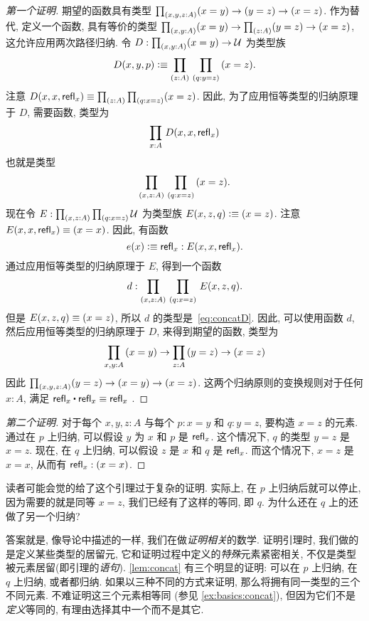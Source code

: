 \begin{proof}[第一个证明]
    期望的函数具有类型 $\prd{x,y,z:A} (x= y) \to (y= z)\to (x= z)$.
    作为替代, 定义一个函数, 具有等价的类型 $\prd{x,y:A} (x= y) \to \prd{z:A} (y= z)\to (x= z)$, 这允许应用两次路径归纳.
    令 $D:\prd{x,y:A} (x=y) \to \type$ 为类型族
    \begin{equation*}
        D(x,y,p)\defeq \prd{z:A}{q:y=z} (x=z).
    \end{equation*}
    注意 $D(x,x,\refl x) \jdeq \prd{z:A}{q:x=z} (x=z)$.
    因此, 为了应用恒等类型的归纳原理于 $D$, 需要函数, 类型为
    \begin{equation}
        \label{eq:concatD}
        \prd{x:A} D(x,x,\refl{x})
    \end{equation}
    也就是类型
    \[ \prd{x,z:A}{q:x=z} (x=z). \]
    现在令 $E:\prd{x,z:A}{q:x=z}\type$ 为类型族 $E(x,z,q)\vcentcolon\equiv (x=z)$.
    注意 $E(x,x,\mathsf{refl}_{x}) \equiv (x=x)$.
    因此, 有函数
    \begin{equation*}
        e(x) \vcentcolon\equiv \mathsf{refl}_{x} : E(x,x,\mathsf{refl}_{x}).
    \end{equation*}
    通过应用恒等类型的归纳原理于 $E$, 得到一个函数
    \begin{equation*}
        d : \prd{x,z:A}{q:x=z} E(x,z,q).
    \end{equation*}
    但是 $E(x,z,q)\equiv (x=z)$, 所以 $d$ 的类型是~\eqref{eq:concatD}.
    因此, 可以使用函数 $d$, 然后应用恒等类型的归纳原理于 $D$, 来得到期望的函数, 类型为
    \begin{equation*}
        \prd{x,y:A} (x= y) \to \prd{z:A} (y= z)\to (x= z)
    \end{equation*}
    因此 $\prd{x,y,z:A} (y=z) \to (x=y) \to (x=z)$.
    这两个归纳原则的变换规则对于任何 $x:A$, 满足 $\refl{x}\ct \refl{x}\jdeq \refl{x}$ .
\end{proof}

\begin{proof}[第二个证明]
    对于每个 $x,y,z:A$ 与每个 $p:x=y$ 和 $q:y=z$, 要构造 $x=z$ 的元素.
    通过在 $p$ 上归纳, 可以假设 $y$ 为 $x$ 和 $p$ 是 $\mathsf{refl}_{x}$.
    这个情况下, $q$ 的类型 $y=z$ 是 $x=z$.
    现在, 在 $q$ 上归纳, 可以假设 $z$ 是 $x$ 和 $q$ 是 $\mathsf{refl}_{x}$.
    而这个情况下, $x=z$ 是 $x=x$, 从而有 $\mathsf{refl}_{x}:(x=x)$.
\end{proof}

读者可能会觉的给了这个引理过于复杂的证明. 实际上, 在 $p$ 上归纳后就可以停止, 因为需要的就是同等 $x=z$, 我们已经有了这样的等同, 即 $q$.
为什么还在 $q$ 上的还做了另一个归纳?

答案就是, 像导论中描述的一样, 我们在做\emph{证明相关}的数学.
%
证明引理时, 我们做的是定义某些类型的居留元, 它和证明过程中定义的\emph{特殊}元素紧密相关, 不仅是类型被元素居留(即引理的\emph{语句}).
\cref{lem:concat} 有三个明显的证明: 可以在 $p$ 上归纳, 在 $q$ 上归纳, 或者都归纳.
如果以三种不同的方式来证明, 那么将拥有同一类型的三个不同元素.
不难证明这三个元素相等同 (参见 \cref{ex:basics:concat}), 但因为它们不是\emph{定义}等同的, 有理由选择其中一个而不是其它.

